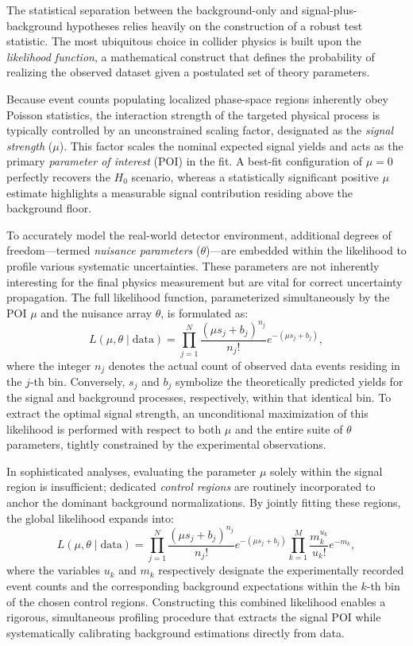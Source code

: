 The statistical separation between the background-only and signal-plus-background hypotheses relies heavily on the construction of a robust test statistic. The most ubiquitous choice in collider physics is built upon the \textit{likelihood function}, a mathematical construct that defines the probability of realizing the observed dataset given a postulated set of theory parameters.

Because event counts populating localized phase-space regions inherently obey Poisson statistics, the interaction strength of the targeted physical process is typically controlled by an unconstrained scaling factor, designated as the \textit{signal strength} ($\mu$). This factor scales the nominal expected signal yields and acts as the primary \textit{parameter of interest} (POI) in the fit. A best-fit configuration of $\mu = 0$ perfectly recovers the $H_0$ scenario, whereas a statistically significant positive $\mu$ estimate highlights a measurable signal contribution residing above the background floor.

To accurately model the real-world detector environment, additional degrees of freedom—termed \textit{nuisance parameters} ($\theta$)—are embedded within the likelihood to profile various systematic uncertainties. These parameters are not inherently interesting for the final physics measurement but are vital for correct uncertainty propagation. The full likelihood function, parameterized simultaneously by the POI $\mu$ and the nuisance array $\theta$, is formulated as:
\begin{equation}
\label{eqn:likelihood}
L(\mu,\theta \mid \text{data}) = \prod_{j=1}^{N} \frac{(\mu s_j + b_j)^{n_j}}{n_j!} e^{-(\mu s_j + b_j)},
\end{equation}
where the integer $n_j$ denotes the actual count of observed data events residing in the $j$-th bin. Conversely, $s_j$ and $b_j$ symbolize the theoretically predicted yields for the signal and background processes, respectively, within that identical bin. To extract the optimal signal strength, an unconditional maximization of this likelihood is performed with respect to both $\mu$ and the entire suite of $\theta$ parameters, tightly constrained by the experimental observations.

In sophisticated analyses, evaluating the parameter $\mu$ solely within the signal region is insufficient; dedicated \textit{control regions} are routinely incorporated to anchor the dominant background normalizations. By jointly fitting these regions, the global likelihood expands into:
\begin{equation}
\label{eqn:likelihood2}
L(\mu,\theta \mid \text{data}) = \prod_{j=1}^{N} \frac{(\mu s_j + b_j)^{n_j}}{n_j!} e^{-(\mu s_j + b_j)}
\prod_{k=1}^{M} \frac{m_k^{u_k}}{u_k!} e^{-m_k},
\end{equation}
where the variables $u_k$ and $m_k$ respectively designate the experimentally recorded event counts and the corresponding background expectations within the $k$-th bin of the chosen control regions. Constructing this combined likelihood enables a rigorous, simultaneous profiling procedure that extracts the signal POI while systematically calibrating background estimations directly from data.

